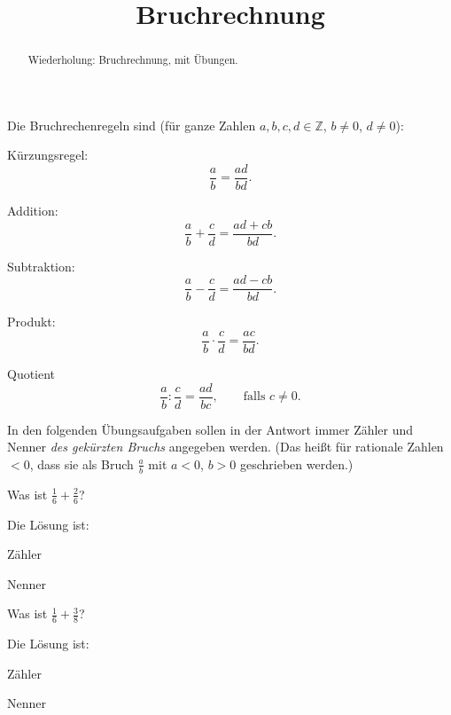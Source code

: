 \documentclass{ximera}
\title{Bruchrechnung}
\begin{document}
\begin{abstract}
Wiederholung: Bruchrechnung, mit Übungen.
\end{abstract}
\maketitle

Die Bruchrechenregeln sind (für ganze Zahlen $a,b,c,d\in\mathbb Z$, $b\ne 0$, $d\ne 0$):

Kürzungsregel:
\[
\frac{a}{b} = \frac{ad}{bd}.
\]

Addition:
\[
\frac{a}{b} + \frac{c}{d} = \frac{ad  +cb}{bd}.
\]

Subtraktion:
\[
\frac{a}{b} - \frac{c}{d} = \frac{ad  -cb}{bd}.
\]

Produkt:
\[
\frac{a}{b} \cdot \frac{c}{d} = \frac{ac}{bd}.
\]

Quotient
\[
\frac{a}{b} : \frac{c}{d} = \frac{ad}{bc},\qquad \text{falls } c\ne 0.
\]


In den folgenden Übungsaufgaben sollen in der Antwort immer Zähler und Nenner \emph{des gekürzten Bruchs} angegeben werden. (Das heißt für rationale Zahlen $<0$, dass sie als Bruch $\frac ab$ mit $a<0$, $b>0$ geschrieben werden.)


\begin{question}[5cm]
Was ist $\frac{1}{6} + \frac{2}{6}$?
\begin{solution}
Die Lösung ist:

Zähler 

Nenner 
\end{solution}
\end{question}


\begin{question}
Was ist $\frac{1}{6} + \frac{3}{8}$?
\begin{solution}
Die Lösung ist:

Zähler 

Nenner 
\end{solution}
\end{question}
\end{document}
